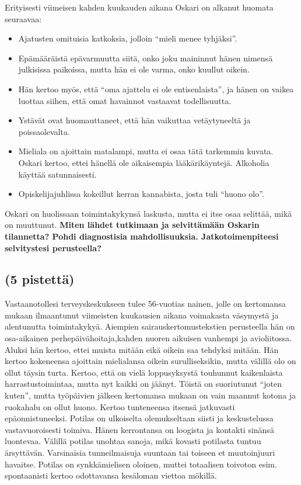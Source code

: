 \documentclass[
]{book}
\providecommand{\tightlist}{%
  \setlength{\itemsep}{0pt}\setlength{\parskip}{0pt}}
\begin{document}
Erityisesti viimeisen kahden kuukauden aikana Oskari on alkanut huomata seuraavaa:

\begin{itemize}
\tightlist
\item
  Ajatusten omituisia katkoksia, jolloin ``mieli menee tyhjäksi''.
\item
  Epämääräistä epävarmuutta siitä, onko joku maininnut hänen nimensä julkisissa paikoissa, mutta hän ei ole varma, onko kuullut oikein.
\item
  Hän kertoo myös, että ``oma ajattelu ei ole entisenlaista'', ja hänen on vaikea luottaa siihen, että omat havainnot vastaavat todellisuutta.
\item
  Ystävät ovat huomauttaneet, että hän vaikuttaa vetäytyneeltä ja poissaolevalta.
\item
  Mieliala on ajoittain matalampi, mutta ei osaa tätä tarkemmin kuvata. Oskari kertoo, ettei hänellä ole aikaisempia lääkärikäyntejä. Alkoholia käyttää satunnaisesti.
\item
  Opiskelijajuhlissa kokeillut kerran kannabista, josta tuli ``huono olo''.
\end{itemize}

Oskari on huolissaan toimintakykynsä laskusta, mutta ei itse osaa selittää, mikä on muuttunut. \textbf{Miten lähdet tutkimaan ja selvittämään Oskarin tilannetta? Pohdi diagnostisia mahdollisuuksia. Jatkotoimenpiteesi selvitystesi perusteella?}

\subsection{(5 pistettä)}\label{pistettuxe4}

Vastaanotollesi terveyskeskukseen tulee 56-vuotias nainen, jolle on kertomansa mukaan ilmaantunut viimeisten kuukausien aikana voimakasta väsymystä ja alentunutta toimintakykyä. Aiempien sairauskertomustekstien perusteella hän on osa-aikainen perhepäivähoitaja,kahden nuoren aikuisen vanhempi ja avioliitossa.
Aluksi hän kertoo, ettei muista mitään eikä oikein saa tehdyksi mitään. Hän kertoo kokeneensa ajoittain mielialansa oikein surulliseksikin, mutta välillä olo on ollut täysin turta. Kertoo, että on vielä loppusyksystä touhunnut kaikenlaista harrastustoimintaa, mutta nyt kaikki on jäänyt. Töistä on suoriutunut ``joten kuten'', mutta työpäivien jälkeen kertomansa mukaan on vain maannut kotona ja ruokahalu on ollut huono. Kertoo tunteneensa itsensä jatkuvasti epäonnistuneeksi.
Potilas on ulkoiselta olemukseltaan siisti ja keskustelussa vastavuoroisesti toimiva. Hänen kerrontansa on loogista ja kontakti sinänsä luontevaa. Välillä potilas unohtaa sanoja, mikä kovasti potilasta tuntuu ärsyttävän. Varsinaisia tunneilmaisuja suuntaan tai toiseen et muutoinjuuri havaitse. Potilas on synkkämielisen oloinen, muttei totaalisen toivoton esim. spontaanisti kertoo odottavansa kesäloman viettoa mökillä.
\end{document}
